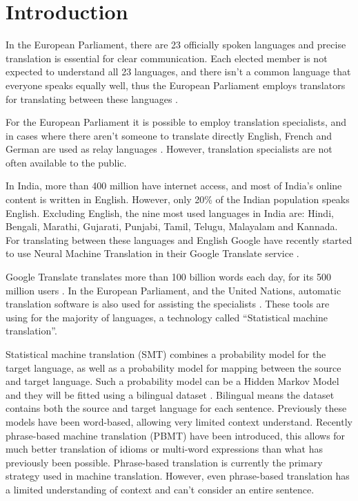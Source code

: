 \chapter{Introduction}

In the European Parliament, there are 23 officially spoken languages and precise translation is essential for clear communication. Each elected member is not expected to understand all 23 languages, and there isn't a common language that everyone speaks equally well, thus the European Parliament employs translators for translating between these languages \cite{europarl-translation}.

For the European Parliament it is possible to employ translation specialists, and in cases where there aren't someone to translate directly English, French and German are used as relay languages \cite{europarl-translation}. However, translation specialists are not often available to the public.

In India, more than 400 million have internet access, and most of India’s online content is written in English. However, only 20\% of the Indian population speaks English. Excluding English, the nine most used languages in India are: Hindi, Bengali, Marathi, Gujarati, Punjabi, Tamil, Telugu, Malayalam and Kannada. For translating between these languages and English Google have recently started to use Neural Machine Translation in their Google Translate service \cite{google-translate-india}.

Google Translate translates more than 100 billion words each day, for its 500 million users \cite{google-translate-stats}. In the European Parliament, and the United Nations, automatic translation software is also used for assisting the specialists \cite{europarl-translation}. These tools are using for the majority of languages, a technology called ``Statistical machine translation''.

Statistical machine translation (SMT) combines a probability model for the target language, as well as a probability model for mapping between the source and target language. Such a probability model can be a Hidden Markov Model and they will be fitted using a bilingual dataset \cite{smt-comparetive-study}. Bilingual means the dataset contains both the source and target language for each sentence. Previously these models have been word-based, allowing very limited context understand. Recently phrase-based machine translation (PBMT) have been introduced, this allows for much better translation of idioms or multi-word expressions than what has previously been possible. Phrase-based translation is currently the primary strategy used in machine translation. However, even phrase-based translation has a limited understanding of context and can't consider an entire sentence.

